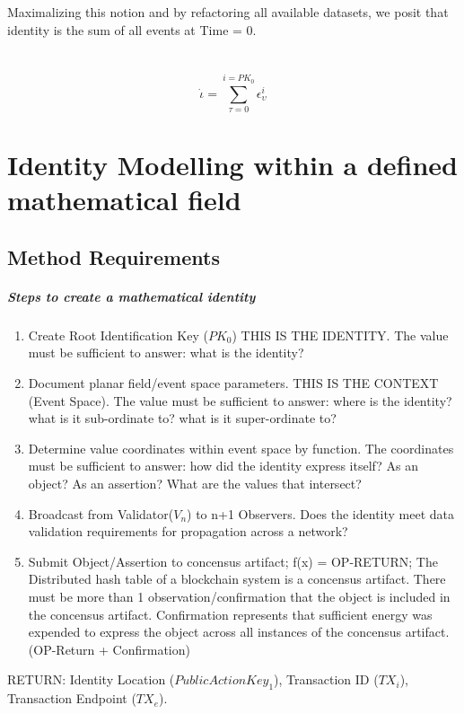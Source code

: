 \documentclass{article}
\begin{document}
Maximalizing this notion and by refactoring all available datasets, we posit that identity is the sum of all events at Time = 0.\\
\\\\
	\begin{equation}
		\dot \iota = \sum_{\tau=0}^{i=PK_0} \epsilon^i_\upsilon
	\end{equation}
 		


\section{Identity Modelling within a defined mathematical field}
	\subsection{Method Requirements}
			\subparagraph{Steps to create a mathematical identity}
			\begin{enumerate}
				\item Create Root Identification Key ($PK_0$)  THIS IS THE IDENTITY.  The value must be sufficient to answer: what is the identity?
				\item Document planar field/event space parameters.  THIS IS THE CONTEXT (Event Space).  The value must be sufficient to answer: where is the identity? what is it sub-ordinate to? what is it super-ordinate to?
				\item Determine value coordinates within event space by function. The coordinates must be sufficient to answer: how did the identity express itself?  As an object? As an assertion? What are the values that intersect?
				\item Broadcast from Validator($V_n$) to n+1 Observers.  Does the identity meet data validation requirements for propagation across a network?
				\item Submit Object/Assertion to concensus artifact;  f(x) = OP-RETURN;  The Distributed hash table of a blockchain system is a concensus artifact.  There must be more than 1 observation/confirmation that the object is included in the concensus artifact. Confirmation represents that sufficient energy was expended to express the object across all instances of the concensus artifact. (OP-Return + Confirmation)  
			\end{enumerate}			
			RETURN:  Identity Location ($PublicActionKey_1$),  Transaction ID ($TX_i$), Transaction Endpoint ($TX_e$).
			
\end{document}

